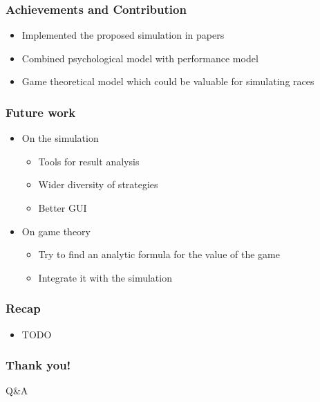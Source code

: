 \documentclass{beamer}
\begin{document}
\begin{frame}
\frametitle{Achievements and Contribution}

\begin{itemize}
	\item Implemented the proposed simulation in papers %
	\item Combined psychological model with performance model
	\item Game theoretical model which could be valuable for simulating races
\end{itemize}

\end{frame}

\begin{frame}
\frametitle{Future work}
  \begin{itemize}
  \item{On the simulation}
    \begin{itemize}
    \item Tools for result analysis
    \item Wider diversity of strategies
    \item Better GUI
    \end{itemize}
    
    \pause
    
    \vspace{0.3cm}

  \item{On game theory}
    \begin{itemize}
    \item Try to find an analytic formula for the value of the game
    \item Integrate it with the simulation
    \end{itemize}
  \end{itemize}
\end{frame}

\begin{frame}
\frametitle{Recap}

\begin{itemize}
	\item TODO
\end{itemize}

\end{frame}


\begin{frame}
\frametitle{Thank you!}

\huge
\centering Q\&A

\end{frame}

\end{document}

